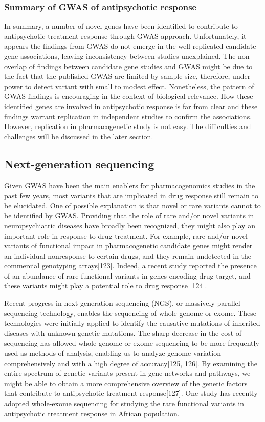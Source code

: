 \documentclass[12pt]{report}
\begin{document}
			\subsubsection{Summary of GWAS of antipsychotic response}
				In summary, a number of novel genes have been identified to contribute to antipsychotic treatment response through GWAS approach. 
				Unfortunately, it appears the findings from GWAS do not emerge in the well-replicated candidate gene associations, leaving inconsistency between studies unexplained. 
				The non-overlap of findings between candidate gene studies and GWAS might be due to the fact that the published GWAS are limited by sample size, therefore, under power to detect variant with small to modest effect. 
				Nonetheless, the pattern of GWAS findings is encouraging in the context of biological relevance. 
				How these identified genes are involved in antipsychotic response is far from clear and these findings warrant replication in independent studies to confirm the associations. 
				However, replication in pharmacogenetic study is not easy. 
				The difficulties and challenges will be discussed in the later section. 
			\subsection{Next-generation sequencing}
				Given GWAS have been the main enablers for pharmacogenomics studies in the past few years, most variants that are implicated in drug response still remain to be elucidated. 
				One of possible explanation is that novel or rare variants cannot to be identified by GWAS. 
				Providing that the role of rare and/or novel variants in neuropsychiatric diseases have broadly been recognized, they might also play an important role in response to drug treatment.
				For example, rare and/or novel variants of functional impact in pharmacogenetic candidate genes might render an individual nonresponse to certain drugs, and they remain undetected in the commercial genotyping arrays[123].
				Indeed, a recent study reported the presence of an abundance of rare functional variants in genes encoding drug target, and these variants might play a potential role to drug response [124]. 
				 
				Recent progress in next-generation sequencing (NGS), or massively parallel sequencing technology, enables the sequencing of whole genome or exome.
				These technologies were initially applied to identify the causative mutations of inherited diseases with unknown genetic mutations. 
				The sharp decrease in the cost of sequencing has allowed whole-genome or exome sequencing to be more frequently used as methods of analysis, enabling us to analyze genome variation comprehensively and with a high degree of accuracy[125, 126]. 
				By examining the entire spectrum of genetic variants present in gene networks and pathways, we might be able to obtain a more comprehensive overview of the genetic factors that contribute to antipsychotic treatment response[127]. 
				One study has recently adopted whole-exome sequencing for studying the rare functional variants in antipsychotic treatment response in African population.  
				
\end{document}
